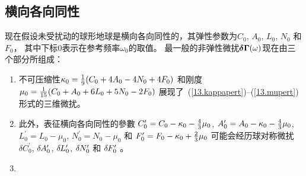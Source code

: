 {{\renewcommand{\thesubsection}{$\!\!\!\raise1.3ex\hbox{$\star$}\!\!$
\arabic{chapter}.\arabic{section}.\arabic{subsection}}
\subsection{横向各向同性}
%
%
\renewcommand{\thesubsection}{\arabic{chapter}.\arabic{section}.\arabic{subsection}}
\label{sec.13.ti}

现在假设未受扰动的球形地球是横向各向同性的，其弹性参数为$C_0$, $A_0$, $L_0$, $N_0$ 和 $F_0$， 
其中下标$0$表示在参考频率$\omega_0$的取值。
最一般的非弹性微扰$\mbox{\boldmath $\bf \delta$}\mbox{\boldmath $\bf \Gamma$}(\mbox{$\omega$})$现在由三个部分所组成：
\begin{enumerate}
\item 
不可压缩性$\kappa_0=\mbox{$\frac{1}{9}$} (C_0+4A_0-4N_0+4F_0)$
和刚度$\mu_0=\mbox{$\frac{1}{15}$}(C_0+A_0+6L_0+5N_0-2F_0)$ 
展现了~(\ref{13.kappapert})--(\ref{13.mupert})形式的三维微扰。
\item 
此外，表征横向各向同性的參數
$C_0^{\prime}=C_0-\kappa_0-\mbox{$\frac{4}{3}$}\mu_0$,
$A_0^{\prime}=A_0-\kappa_0-\mbox{$\frac{4}{3}$}\mu_0$,
$L_0^{\prime}=L_0-\mu_0$, $N_0^{\prime}=N_0-\mu_0$
和 
$F_0^{\prime}=F_0-\kappa_0+\mbox{$\frac{2}{3}$}\mu_0$
可能会经历球对称微扰
$\delta C_0^{\prime}$,
$\delta\hspace{-0.2 mm}A_0^{\prime}$,
$\delta\hspace{-0.2 mm}L_0^{\prime}$,
$\delta\hspace{-0.2 mm}N_0^{\prime}$ 
和
$\delta\hspace{-0.2 mm}F_0^{\prime}$
。
\item  

\end{enumerate}}}
